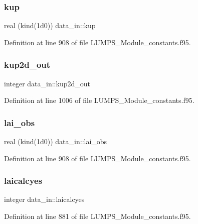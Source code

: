 \subsubsection{\texorpdfstring{kup}{kup}}
{\footnotesize\ttfamily real (kind(1d0)) data\+\_\+in\+::kup}



Definition at line 908 of file L\+U\+M\+P\+S\+\_\+\+Module\+\_\+constants.\+f95.

\mbox{\label{namespacedata__in_acaad819231464876d06a326598caf5d1}} 
\subsubsection{\texorpdfstring{kup2d\+\_\+out}{kup2d\_out}}
{\footnotesize\ttfamily integer data\+\_\+in\+::kup2d\+\_\+out}



Definition at line 1006 of file L\+U\+M\+P\+S\+\_\+\+Module\+\_\+constants.\+f95.

\mbox{\label{namespacedata__in_af9683d39e50e85ff167afd46236c7643}} 
\subsubsection{\texorpdfstring{lai\+\_\+obs}{lai\_obs}}
{\footnotesize\ttfamily real (kind(1d0)) data\+\_\+in\+::lai\+\_\+obs}



Definition at line 908 of file L\+U\+M\+P\+S\+\_\+\+Module\+\_\+constants.\+f95.

\mbox{\label{namespacedata__in_a3c3027e7975cd18122a58ae965ee0f86}} 
\subsubsection{\texorpdfstring{laicalcyes}{laicalcyes}}
{\footnotesize\ttfamily integer data\+\_\+in\+::laicalcyes}



Definition at line 881 of file L\+U\+M\+P\+S\+\_\+\+Module\+\_\+constants.\+f95.

